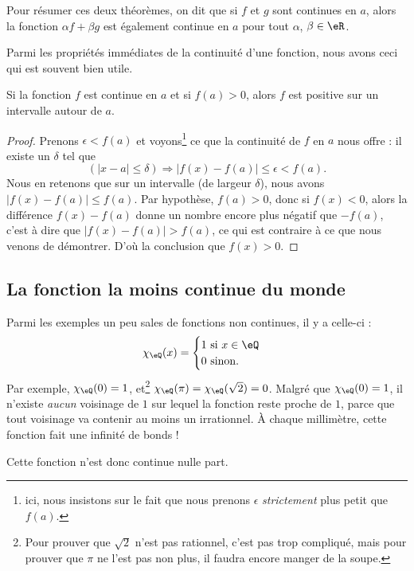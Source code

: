 Pour résumer ces deux théorèmes, on dit que si $f$ et $g$ sont continues en $a$, alors la fonction $\alpha f+\beta g$ est également continue en $a$ pour tout $\alpha$, $\beta\in\eR$.

Parmi les propriétés immédiates de la continuité d'une fonction, nous avons ceci qui est souvent bien utile.

\begin{corollary}   \label{CorNNPYooMbaYZg}
Si la fonction $f$ est continue en $a$ et si $f(a)>0$, alors $f$ est positive sur un intervalle autour de $a$.
\end{corollary}

\begin{proof}
Prenons $\epsilon<f(a)$ et voyons\footnote{ici, nous insistons sur le fait que nous prenons $\epsilon$ \emph{strictement} plus petit que $f(a)$.} ce que la continuité de $f$ en $a$ nous offre : il existe un $\delta$ tel que
\[ 
  (| x-a |\leq \delta)\Rightarrow | f(x)-f(a) |\leq\epsilon < f(a).
\]
Nous en retenons que sur un intervalle (de largeur $\delta$), nous avons $| f(x)-f(a) |\leq f(a)$. Par hypothèse, $f(a)>0$, donc si $f(x)<0$, alors la différence $f(x)-f(a)$ donne un nombre encore plus négatif que $-f(a)$, c'est à dire que $| f(x)-f(a) |>f(a)$, ce qui est contraire à ce que nous venons de démontrer. D'où la conclusion que $f(x)>0$.
\end{proof}

\subsection{La fonction la moins continue du monde}

Parmi les exemples un peu sales de fonctions non continues, il y a celle-ci :
\[ 
  \chi_{\eQ}(x)=
\begin{cases}
    1 \text{ si }x\in\eQ\\
    0 \text{ sinon.}
\end{cases}
\]
Par exemple, $\chi_{\eQ}(0)=1$, et\footnote{Pour prouver que $\sqrt{2}$ n'est pas rationnel, c'est pas trop compliqué, mais pour prouver que $\pi$ ne l'est pas non plus, il faudra encore manger de la soupe.} $\chi_{\eQ}(\pi)=\chi_{\eQ}(\sqrt{2})=0$. Malgré que $\chi_{\eQ}(0)=1$, il n'existe \emph{aucun} voisinage de $1$ sur lequel la fonction reste proche de $1$, parce que tout voisinage va contenir au moins un irrationnel. À chaque millimètre, cette fonction fait une infinité de bonds !

Cette fonction n'est donc continue nulle part. 

